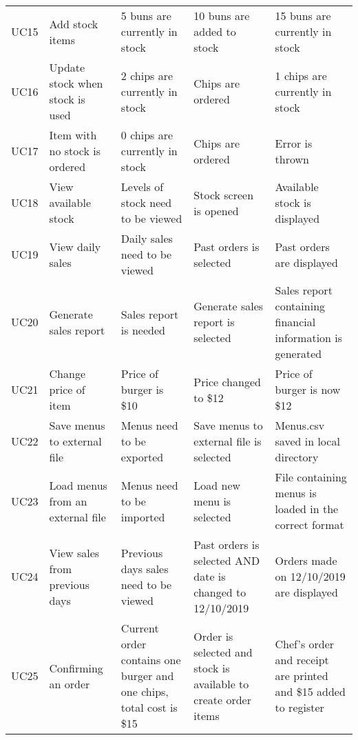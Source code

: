 \begin{table}
\begin{tabular}{lllll}
		UC15 & Add stock items & 5 buns are currently in stock & 10 buns are added to stock & 15 buns are currently in stock \\
		UC16 & Update stock when stock is used & 2 chips are currently in stock & Chips are ordered & 1 chips are currently in stock \\
		UC17 & Item with no stock is ordered & 0 chips are currently in stock & Chips are ordered & Error is thrown \\
		UC18 & View available stock & Levels of stock need to be viewed & Stock screen is opened & Available stock is displayed \\
		UC19 & View daily sales & Daily sales need to be viewed & Past orders is selected & Past orders are displayed \\
		UC20 & Generate sales report & Sales report is needed & Generate sales report is selected & Sales report containing financial information is generated \\
		UC21 & Change price of item & Price of burger is \$10 & Price changed to \$12 & Price of burger is now \$12 \\
		UC22 & Save menus to external file & Menus need to be exported & Save menus to external file is selected & Menus.csv saved in local directory \\
		UC23 & Load menus from an external file & Menus need to be imported & Load new menu is selected & File containing menus is loaded in the correct format \\
		UC24 & View sales from previous days & Previous days sales need to be viewed & Past orders is selected AND date is changed to 12/10/2019 & Orders made on 12/10/2019 are displayed \\
		UC25 & Confirming an order & Current order contains one burger and one chips, total cost is \$15 & Order is selected and stock is available to create order items & Chef's order and receipt are printed and \$15 added to register \\		
\end{tabular}
\end{table}
